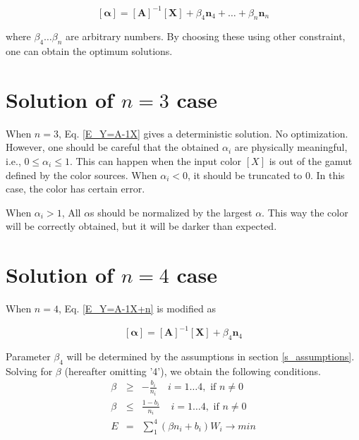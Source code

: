 \documentclass[dvipdfmx,uplatex]{article}
\begin{document}
\begin{equation}
  \label{E_Y=A-1X+n}
  \left[ \boldsymbol{\alpha} \right] =
  \left[ \boldsymbol{A} \right]^{-1}
  \left[ \boldsymbol{X} \right]
  + \beta_4 \boldsymbol{n}_4 + \ldots + \beta_n \boldsymbol{n}_n
\end{equation}

where $ \beta_4 \ldots \beta_n $ are arbitrary numbers. By choosing these using other constraint, one can obtain the optimum solutions.




\section{Solution of $n=3$ case}

When $n=3$, Eq. \ref{E_Y=A-1X} gives a deterministic solution. No optimization. However, one should be careful that the obtained $ \alpha_i $ are physically meaningful, i.e., $ 0 \leq \alpha_i \leq 1 $. This can happen when the input color $[X]$ is out of the gamut defined by the color sources. When $ \alpha_i < 0$, it should be truncated to 0. In this case, the color has certain error.

When $ \alpha_i > 1 $, All $\alpha$s should be normalized by the largest $\alpha$. This way the color will be correctly obtained, but it will be darker than expected.




\section{Solution of $n=4$ case}

When $n=4$, Eq. \ref{E_Y=A-1X+n} is modified as

\begin{equation}
  \label{E_Y=A-1X+1}
  \left[ \boldsymbol{\alpha} \right] =
  \left[ \boldsymbol{A} \right]^{-1}
  \left[ \boldsymbol{X} \right]
  + \beta_4 \boldsymbol{n}_4
\end{equation}

Parameter $\beta_4$ will be determined by the assumptions in section \ref{s_assumptions}.
Solving for $\beta$ (hereafter omitting '4'), we obtain the following conditions.
\begin{eqnarray}
  \beta &\geq& - \frac{b_i}{n_i} \;\;\;\; i = 1 \ldots 4, \text{ if \(n \neq 0\)} \label{E_betamin} \\
  \beta &\leq& \frac{1 - b_i}{n_i} \;\;\;\; i = 1 \ldots 4, \text{ if \(n \neq 0\)} \label{E_betamax} \\
  E &=& \sum_1^4 (\beta n_i + b_i) W_i \to min \label{E_energy_n4}
\end{eqnarray}
\end{document}
